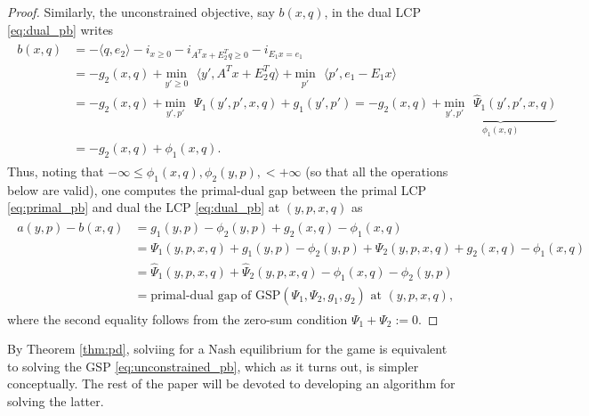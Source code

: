 \documentclass{article} %
\begin{document}
\begin{proof}
Similarly, the unconstrained objective, say
$b(x, q)$, in the dual LCP \eqref{eq:dual_pb} writes
\begin{eqnarray*}
  \begin{aligned}
 b(x, q) &= 
-\langle q, e_2\rangle -i_{x \ge 0} - i_{A^Tx+E_2^Tq \ge 0} -
 i_{E_1x = e_1}\\
 &= -g_2(x, q) + \underset{y' \geq
   0}{\text{min}}\text{ }\langle y', A^Tx + E_2^Tq\rangle +
 \underset{p'}{\text{min}}\text{ }\langle p', e_1-E_1x\rangle\\
    &= -g_2(x, q)
 +\underset{y',p'}{\text{min}}\text{ }\Psi_1(y', p', x, q) +
 g_1(y', p') = -g_2(x, q)
 +\underbrace{\underset{y',p'}{\text{min}}\text{ }\hat{\Psi}_1(y', p',
   x, q)}_{\phi_1(x, q)}\\
 &= -g_2(x, q) + \phi_1(x, q). 
   \end{aligned}
\end{eqnarray*}
Thus, noting that $-\infty \le \phi_1(x, q), \phi_2(y, p), < +\infty$
(so that all the operations below are valid),
one computes the primal-dual gap between the primal LCP
\eqref{eq:primal_pb} and dual the LCP \eqref{eq:dual_pb} at $(y, p, x, q)$ as
\begin{eqnarray*}
  \begin{split}
  a(y, p) - b(x, q) &= g_1(y, p) - \phi_2(y, p) + g_2(x, q) - \phi_1(x,
  q) \\
  &= \Psi_1(y, p, x, q) +  g_1(y, p) - \phi_2(y, p) + \Psi_2(y, p, x,
  q) + g_2(x, q) - \phi_1(x, q)\\
  &= \hat{\Psi}_1(y, p, x, q) + \hat{\Psi}_2(y, p, x, q) - \phi_1(x,
  q) - \phi_2(y, p)\\
  &= \text{primal-dual gap of GSP}(\Psi_1, \Psi_2,
  g_1, g_2) \text{ at }(y, p, x, q),
  \end{split}
\end{eqnarray*}
where the second equality follows from the zero-sum condition $\Psi_1 + \Psi_2
:= 0$.
\end{proof}


By Theorem \ref{thm:pd}, solviing for a Nash equilibrium for
the game is equivalent to solving the GSP
\eqref{eq:unconstrained_pb}, which as it turns out, is simpler
conceptually. The rest of the paper will be devoted to
developing an algorithm for solving the latter.


\end{document}
